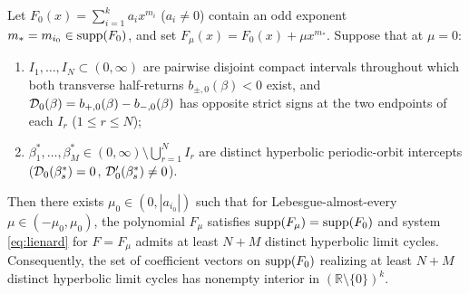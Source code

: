 \begin{lemma}
Let\label{lem:hyperbolicity} $F_0(x)=\sum_{i=1}^k a_i x^{m_i}$ ($a_i\ne 0$) contain an odd exponent $m_*=m_{i_0}\in\operatorname{supp}(F_0)$,
and set $F_\mu(x)=F_0(x)+\mu x^{m_*}$. Suppose that at $\mu=0$:
\begin{enumerate}
  \item[\textup{(a)}] $I_1,\dots,I_N\subset(0,\infty)$ are pairwise disjoint compact intervals
  throughout which both transverse half-returns $b_{\pm,0}(\beta)<0$ exist, and
  $\mathcal{D}_0(\beta)=b_{+,0}(\beta)-b_{-,0}(\beta)$ has opposite strict signs at the two endpoints of
  each $I_r$ ($1\le r\le N$);
  \item[\textup{(b)}] $\beta_1^*,\dots,\beta_M^*\in(0,\infty)\setminus\bigcup_{r=1}^N I_r$ are
  distinct hyperbolic periodic-orbit intercepts ($\mathcal{D}_0(\beta_s^*)=0$, $\mathcal{D}_0'(\beta_s^*)\ne 0$).
\end{enumerate}
Then there exists $\mu_0\in(0,|a_{i_0}|)$ such that for Lebesgue-almost-every $\mu\in(-\mu_0,\mu_0)$,
the polynomial $F_\mu$ satisfies $\operatorname{supp}(F_\mu)=\operatorname{supp}(F_0)$ and system \eqref{eq:lienard} for $F=F_\mu$
admits at least $N+M$ distinct hyperbolic limit cycles. Consequently, the set of coefficient vectors
on $\operatorname{supp}(F_0)$ realizing at least $N+M$ distinct hyperbolic limit cycles has nonempty interior in
$(\mathbb{R}\setminus\{0\})^k$.
\end{lemma}


